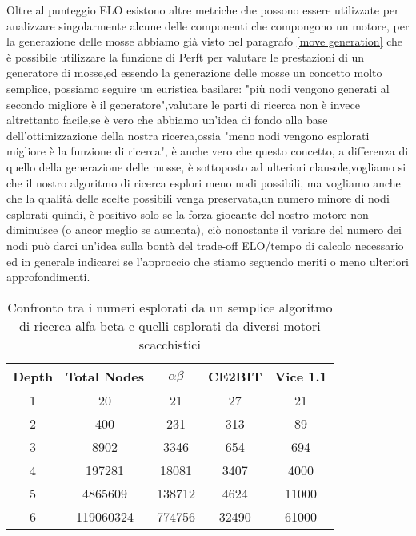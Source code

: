 Oltre al punteggio ELO esistono altre metriche che possono essere utilizzate per analizzare singolarmente alcune delle componenti che compongono un motore,
per la generazione delle mosse abbiamo già visto nel paragrafo \ref{move generation} che è possibile utilizzare la funzione di Perft per valutare le prestazioni di un generatore di mosse,ed essendo la generazione
delle mosse un concetto molto semplice, possiamo seguire un euristica basilare: "più nodi vengono generati al secondo migliore è il generatore",valutare le parti 
di ricerca non è invece altrettanto facile,se è vero che abbiamo un'idea di fondo alla base dell'ottimizzazione della nostra ricerca,ossia "meno nodi vengono esplorati migliore è la funzione di ricerca", è anche vero 
che questo concetto, a differenza di quello della generazione delle mosse, è sottoposto ad ulteriori clausole,vogliamo si che il nostro algoritmo di ricerca esplori meno nodi possibili, ma vogliamo anche che la qualità
delle scelte possibili venga preservata,un numero minore di nodi esplorati quindi, è positivo solo se la forza giocante del nostro motore non diminuisce (o ancor meglio se aumenta), ciò nonostante il variare del numero dei nodi 
può darci un'idea sulla bontà del trade-off ELO/tempo di calcolo necessario ed in generale indicarci se l'approccio che stiamo seguendo meriti o meno ulteriori approfondimenti.
\begin{table}[h]
\begin{center}
    \begin{tabular}{|c|c|c|c|c|} 
     \hline
     Depth & Total Nodes  & $\alpha\beta$ & CE2BIT & Vice 1.1 \\ [0.5ex] 
     \hline
     1 & 20  & 21 & 27 & 21 \\ 
     \hline
     2 & 400  &  231 & 313 & 89\\
     \hline
     3 & 8902  &  3346 & 654 & 694 \\
     \hline
     4 & 197281  & 18081 &  3407 & 4000 \\
     \hline
     5 & 4865609  & 138712 & 4624 & 11000 \\ 
     \hline
     6 & 119060324  & 774756 & 32490 & 61000\\
     \hline
    \end{tabular}
    \caption{Confronto tra i numeri esplorati da un semplice algoritmo di ricerca alfa-beta e quelli esplorati da diversi motori scacchistici} \label{tab:sometab}
    \end{center}
\end{table}


